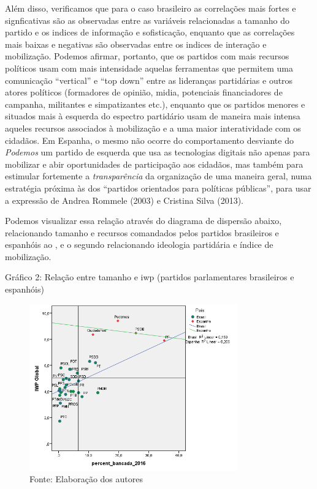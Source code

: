 Além disso, verificamos que para o caso brasileiro as correlações mais
fortes e signficativas são as observadas entre as variáveis relacionadas
a tamanho do partido e os indices de informação e sofisticação, enquanto
que as correlações mais baixas e negativas são observadas entre os
indices de interação e mobilização. Podemos afirmar, portanto, que os
partidos com mais recursos políticos usam com mais intensidade aquelas
ferramentas que permitem uma comunicação ``vertical'' e ``top down'' entre
as lideranças partidárias e outros atores políticos (formadores de
opinião, midia, potenciais financiadores de campanha, militantes e
simpatizantes etc.), enquanto que os partidos menores e situados mais à
esquerda do espectro partidário usam de maneira mais intensa aqueles
recursos associados à mobilização e a uma maior interatividade com os
cidadãos. Em Espanha, o mesmo não ocorre do comportamento desviante do
\emph{Podemos} um partido de esquerda que usa as tecnologias digitais
não apenas para mobilizar e abir oportunidades de participação aos
cidadãos, mas também para estimular fortemente a \emph{transparência} da
organização de uma maneira geral, numa estratégia próxima às dos
``partidos orientados para políticas públicas'', para usar a expressão
de Andrea Rommele (2003) e Cristina Silva (2013).

Podemos visualizar essa relação através do diagrama de dispersão abaixo,
relacionando tamanho e recursos comandados pelos partidos brasileiros e
espanhóis ao , e o segundo relacionando ideologia partidária e índice
de mobilização.

Gráfico 2: Relação entre tamanho e iwp (partidos parlamentares
brasileiros e espanhóis)

\begin{figure}[!ht]
\centering
 \includegraphics[width=90mm]{./imgs/graf2.png}
\caption{Fonte: Elaboração dos autores}
\end{figure}


